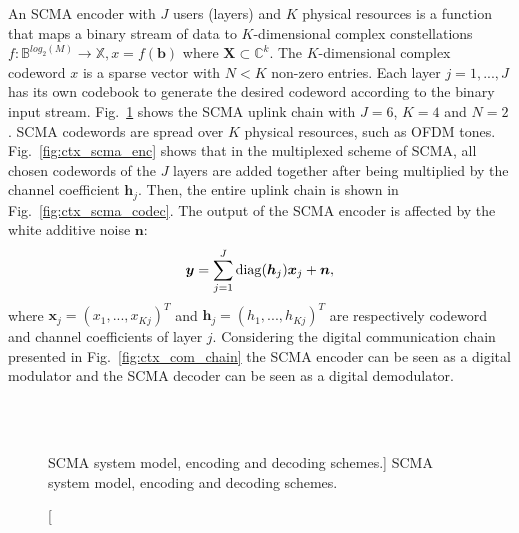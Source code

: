 An SCMA encoder with $J$ users (layers) and $K$ physical resources is a function
that maps a binary stream of data to $K$-dimensional complex constellations
$f : \mathbb{B}^{log_{2}(M)} \rightarrow \mathbb{X}, x = f(\bm{b})$ where
$\bm{X} \subset \mathbb{C}^k$. The $K$-dimensional complex codeword $x$ is a
sparse vector with $N < K$ non-zero entries. Each layer $j=1, ..., J$ has its
own codebook to generate the desired codeword according to the binary input
stream. Fig.~\ref{fig:ctx_scma} shows the SCMA uplink chain with $J = 6$,
$K = 4$ and $N = 2$. SCMA codewords are spread over $K$ physical resources, such
as OFDM tones. Fig.~\ref{fig:ctx_scma_enc} shows that in the multiplexed scheme
of SCMA, all chosen codewords of the $J$ layers are added together after being
multiplied by the channel coefficient $\bm{h}_j$. Then, the entire uplink chain
is shown in Fig.~\ref{fig:ctx_scma_codec}. The output of the SCMA encoder is
affected by the white additive noise $\bm{n}$:
\begin{equation}
  \label{eq:ctx_scma_1}
  \bm{y} = \sum\limits_{j=1}^J \operatorname{diag}(\bm{h}_j)\bm{x}_j+\bm{n},
\end{equation}
where $\bm{x}_j=(x_1,...,x_{Kj})^T$ and $\bm{h}_j=(h_1,...,h_{Kj})^T$ are
respectively codeword and channel coefficients of layer $j$.
Considering the digital communication chain presented in
Fig.~\ref{fig:ctx_com_chain} the SCMA encoder can be seen as a digital modulator
and the SCMA decoder can be seen as a digital demodulator.

\begin{figure}%
  \centering
  \\
  \\
  \quad
  \caption
    [SCMA system model, encoding and decoding schemes.]
    {SCMA system model, encoding and decoding schemes.}
  \label{fig:ctx_scma}
\end{figure}

